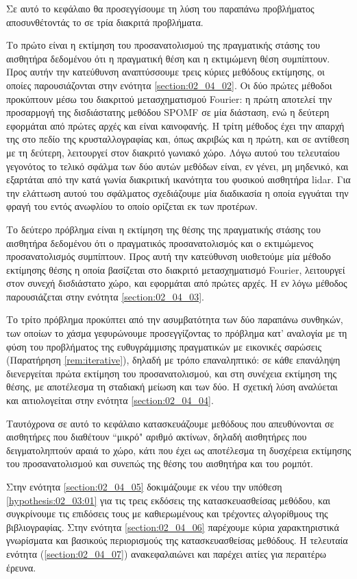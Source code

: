Σε αυτό το κεφάλαιο θα προσεγγίσουμε τη λύση του παραπάνω προβλήματος
αποσυνθέτοντάς το σε τρία διακριτά προβλήματα.

Το πρώτο είναι η εκτίμηση του προσανατολισμού της πραγματικής στάσης του
αισθητήρα δεδομένου ότι η πραγματική θέση και η εκτιμώμενη θέση συμπίπτουν.
Προς αυτήν την κατεύθυνση αναπτύσσουμε τρεις κύριες μεθόδους εκτίμησης, οι
οποίες παρουσιάζονται στην ενότητα \ref{section:02_04_02}. Οι δύο πρώτες
μέθοδοι προκύπτουν μέσω του διακριτού μετασχηματισμού Fourier: η πρώτη αποτελεί
την προσαρμογή της δισδιάστατης μεθόδου SPOMF σε μία διάσταση, ενώ η δεύτερη
εφορμάται από πρώτες αρχές και είναι καινοφανής. Η τρίτη μέθοδος έχει την
απαρχή της στο πεδίο της κρυσταλλογραφίας και, όπως ακριβώς και η πρώτη, και σε
αντίθεση με τη δεύτερη, λειτουργεί στον διακριτό γωνιακό χώρο. Λόγω αυτού του
τελευταίου γεγονότος το τελικό σφάλμα των δύο αυτών μεθόδων είναι, εν γένει, μη
μηδενικό, και εξαρτάται από την κατά γωνία διακριτική ικανότητα του φυσικού
αισθητήρα lidar. Για την ελάττωση αυτού του σφάλματος σχεδιάζουμε μία
διαδικασία η οποία εγγυάται την φραγή του εντός ανωφλίου το οποίο ορίζεται εκ
των προτέρων.

Το δεύτερο πρόβλημα είναι η εκτίμηση της θέσης της πραγματικής στάσης του
αισθητήρα δεδομένου ότι ο πραγματικός προσανατολισμός και ο εκτιμώμενος
προσανατολισμός συμπίπτουν. Προς αυτή την κατεύθυνση υιοθετούμε μία μέθοδο
εκτίμησης θέσης η οποία βασίζεται στο διακριτό μετασχηματισμό Fourier,
λειτουργεί στον συνεχή δισδιάστατο χώρο, και εφορμάται από πρώτες αρχές. Η εν
λόγω μέθοδος παρουσιάζεται στην ενότητα \ref{section:02_04_03}.

Το τρίτο πρόβλημα προκύπτει από την ασυμβατότητα των δύο παραπάνω συνθηκών, των
οποίων το χάσμα γεφυρώνουμε προσεγγίζοντας το πρόβλημα
κατ' αναλογία με τη φύση του προβλήματος της ευθυγράμμισης πραγματικών με
εικονικές σαρώσεις (Παρατήρηση \ref{rem:iterative}), δηλαδή με τρόπο
επαναληπτικό: σε κάθε επανάληψη διενεργείται πρώτα εκτίμηση του
προσανατολισμού, και στη συνέχεια εκτίμηση της θέσης, με αποτέλεσμα τη σταδιακή
μείωση και των δύο. Η σχετική λύση αναλύεται και αιτιολογείται στην ενότητα
\ref{section:02_04_04}.

Ταυτόχρονα σε αυτό το κεφάλαιο κατασκευάζουμε μεθόδους που απευθύνονται σε
αισθητήρες που διαθέτουν ``μικρό" αριθμό ακτίνων, δηλαδή αισθητήρες που
δειγματοληπτούν αραιά το χώρο, κάτι που έχει ως αποτέλεσμα τη δυσχέρεια
εκτίμησης του προσανατολισμού και συνεπώς της θέσης του αισθητήρα και του
ρομπότ.

Στην ενότητα \ref{section:02_04_05} δοκιμάζουμε εκ νέου την υπόθεση
\ref{hypothesis:02_03:01} για τις τρεις εκδόσεις της κατασκευασθείσας μεθόδου,
και συγκρίνουμε τις επιδόσεις τους με καθιερωμένους και τρέχοντες αλγορίθμους
της βιβλιογραφίας. Στην ενότητα \ref{section:02_04_06} παρέχουμε κύρια
χαρακτηριστικά γνωρίσματα και βασικούς περιορισμούς της κατασκευασθείσας
μεθόδους. Η τελευταία ενότητα (\ref{section:02_04_07}) ανακεφαλαιώνει και
παρέχει αιτίες για περαιτέρω έρευνα.
